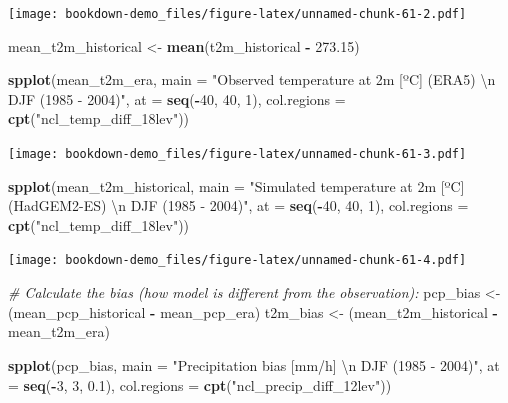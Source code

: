 \documentclass[]{book}
\newenvironment{Shaded}{\begin{snugshade}}{\end{snugshade}}
\newcommand{\CharTok}[1]{\textcolor[rgb]{0.31,0.60,0.02}{#1}}
\newcommand{\CommentTok}[1]{\textcolor[rgb]{0.56,0.35,0.01}{\textit{#1}}}
\newcommand{\DataTypeTok}[1]{\textcolor[rgb]{0.13,0.29,0.53}{#1}}
\newcommand{\DecValTok}[1]{\textcolor[rgb]{0.00,0.00,0.81}{#1}}
\newcommand{\FloatTok}[1]{\textcolor[rgb]{0.00,0.00,0.81}{#1}}
\newcommand{\KeywordTok}[1]{\textcolor[rgb]{0.13,0.29,0.53}{\textbf{#1}}}
\newcommand{\NormalTok}[1]{#1}
\newcommand{\OperatorTok}[1]{\textcolor[rgb]{0.81,0.36,0.00}{\textbf{#1}}}
\newcommand{\StringTok}[1]{\textcolor[rgb]{0.31,0.60,0.02}{#1}}
\begin{document}
\texttt{[image: bookdown-demo\_files/figure-latex/unnamed-chunk-61-2.pdf]}

\begin{Shaded}
\begin{Highlighting}[]
\NormalTok{mean_t2m_historical <-}\StringTok{ }\KeywordTok{mean}\NormalTok{(t2m_historical }\OperatorTok{-}\StringTok{ }\FloatTok{273.15}\NormalTok{)}

\KeywordTok{spplot}\NormalTok{(mean_t2m_era,}
            \DataTypeTok{main =} \StringTok{"Observed temperature at 2m [ºC] (ERA5) }\CharTok{\textbackslash{}n}\StringTok{ DJF (1985 - 2004)"}\NormalTok{,}
            \DataTypeTok{at =} \KeywordTok{seq}\NormalTok{(}\OperatorTok{-}\DecValTok{40}\NormalTok{, }\DecValTok{40}\NormalTok{, }\DecValTok{1}\NormalTok{),}
            \DataTypeTok{col.regions =} \KeywordTok{cpt}\NormalTok{(}\StringTok{"ncl_temp_diff_18lev"}\NormalTok{))}
\end{Highlighting}
\end{Shaded}

\texttt{[image: bookdown-demo\_files/figure-latex/unnamed-chunk-61-3.pdf]}

\begin{Shaded}
\begin{Highlighting}[]
\KeywordTok{spplot}\NormalTok{(mean_t2m_historical,}
            \DataTypeTok{main =} \StringTok{"Simulated temperature at 2m [ºC] (HadGEM2-ES) }\CharTok{\textbackslash{}n}\StringTok{ DJF (1985 - 2004)"}\NormalTok{,}
            \DataTypeTok{at =} \KeywordTok{seq}\NormalTok{(}\OperatorTok{-}\DecValTok{40}\NormalTok{, }\DecValTok{40}\NormalTok{, }\DecValTok{1}\NormalTok{),}
            \DataTypeTok{col.regions =} \KeywordTok{cpt}\NormalTok{(}\StringTok{"ncl_temp_diff_18lev"}\NormalTok{))}
\end{Highlighting}
\end{Shaded}

\texttt{[image: bookdown-demo\_files/figure-latex/unnamed-chunk-61-4.pdf]}

\begin{Shaded}
\begin{Highlighting}[]
\CommentTok{# Calculate the bias (how model is different from the observation):}
\NormalTok{pcp_bias <-}\StringTok{ }\NormalTok{(mean_pcp_historical }\OperatorTok{-}\StringTok{ }\NormalTok{mean_pcp_era)}
\NormalTok{t2m_bias <-}\StringTok{ }\NormalTok{(mean_t2m_historical }\OperatorTok{-}\StringTok{ }\NormalTok{mean_t2m_era)}


\KeywordTok{spplot}\NormalTok{(pcp_bias,}
            \DataTypeTok{main =} \StringTok{"Precipitation bias [mm/h] }\CharTok{\textbackslash{}n}\StringTok{ DJF (1985 - 2004)"}\NormalTok{,}
            \DataTypeTok{at =} \KeywordTok{seq}\NormalTok{(}\OperatorTok{-}\DecValTok{3}\NormalTok{, }\DecValTok{3}\NormalTok{, }\FloatTok{0.1}\NormalTok{),}
            \DataTypeTok{col.regions =} \KeywordTok{cpt}\NormalTok{(}\StringTok{"ncl_precip_diff_12lev"}\NormalTok{))}
\end{Highlighting}
\end{Shaded}
\end{document}
